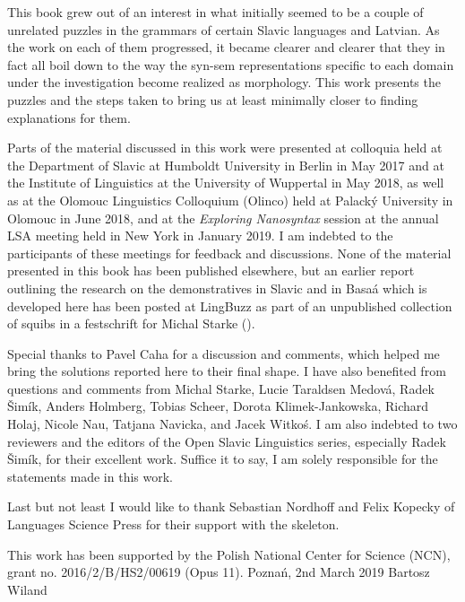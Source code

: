 
This book grew out of an interest in what initially seemed to be a couple of unrelated puzzles in the grammars of certain Slavic languages and Latvian. As the work on each of them progressed, it became clearer and clearer that they in fact all boil down to the way the syn-sem representations specific to each domain under the investigation become realized as morphology. This work presents the puzzles and the steps taken to bring us at least minimally closer to finding explanations for them.
\par
Parts of the material discussed in this work were presented at colloquia held at the Department of Slavic at Humboldt University in Berlin in May 2017 and at the Institute of Linguistics at the University of Wuppertal in May 2018, as well as at the Olomouc Linguistics Colloquium (Olinco) held at Palack\'y University in Olomouc in June 2018, and at the \textit{Exploring Nanosyntax} session at the annual LSA meeting held in New York in January 2019. I am indebted to the participants of these meetings for feedback and discussions. None of the material presented in this book has been published elsewhere, but an earlier report outlining the research on the demonstratives in Slavic and in Basa\'a which is developed here has been posted at LingBuzz as part of an unpublished collection of squibs in a festschrift for Michal Starke (\citealt{WilandTUM}). 
\par 
Special thanks to  Pavel Caha for a discussion and comments, which helped me bring the solutions reported here to their final shape.
I have also benefited from questions and comments from Michal Starke,   Lucie Taraldsen Medov\'a,   Radek \v{S}im\'ik,   Anders Holmberg,  Tobias Scheer,   Dorota Klimek-Jankowska,  Richard Holaj,  Nicole Nau,   Tatjana Navicka, and  Jacek Witko\'s. I am also indebted to two reviewers and the editors of the Open Slavic Linguistics series, especially Radek \v{S}im\'ik, for their excellent work. Suffice it to say, I am solely responsible for the statements made in this work. 
\par
Last but not least I would like to thank  Sebastian Nordhoff  and Felix Kopecky  of Languages Science Press for their support with the \XeLaTeX{} skeleton.
 \par
 This work has been supported by the Polish National Center for Science (NCN), grant no. 2016/2/B/HS2/00619 (Opus 11).
\bigbreak
\noindent 
Pozna\'n, 2nd March 2019 \hfill Bartosz Wiland


\begin{refsection}
\printbibliography[heading=subbibliography]
\end{refsection}

